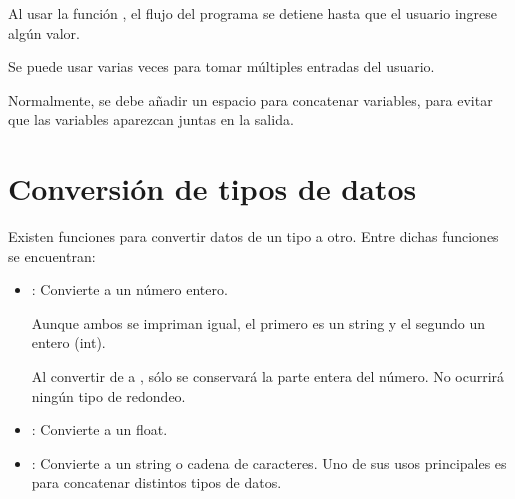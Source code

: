 Al usar la función , el flujo del programa se detiene hasta que el usuario ingrese algún valor.\smallskip

Se puede usar  varias veces para tomar múltiples entradas del usuario.


Normalmente, se debe añadir un espacio para concatenar variables, para evitar que las variables aparezcan juntas en la salida.

\section{Conversión de tipos de datos}

Existen funciones para convertir datos de un tipo a otro. Entre dichas funciones se encuentran:

\begin{itemize}
  \item {}: Convierte a un número entero.
  

  Aunque ambos se impriman igual, el primero es un string y el segundo un entero (int).


  Al convertir de  a , sólo se conservará la parte entera del número. No ocurrirá ningún tipo de redondeo.


  \item {}: Convierte a un float.
  

  \item {}: Convierte a un string o cadena de caracteres. Uno de sus usos principales es para concatenar distintos tipos de datos.


\end{itemize}

